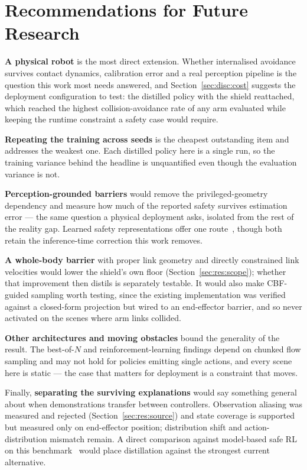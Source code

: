 \documentclass[a4paper,11pt]{report}
\begin{document}
\section{Recommendations for Future Research}\label{sec:conc:future}

\textbf{A physical robot} is the most direct extension. Whether internalised avoidance survives
contact dynamics, calibration error and a real perception pipeline is the question this work most
needs answered, and Section~\ref{sec:disc:cost} suggests the deployment configuration to test: the
distilled policy with the shield reattached, which reached the highest collision-avoidance rate of
any arm evaluated while keeping the runtime constraint a safety case would require.

\textbf{Repeating the training across seeds} is the cheapest outstanding item and addresses the
weakest one. Each distilled policy here is a single run, so the training variance behind the
headline is unquantified even though the evaluation variance is not.

\textbf{Perception-grounded barriers} would remove the privileged-geometry dependency and measure
how much of the reported safety survives estimation error --- the same question a physical
deployment asks, isolated from the rest of the reality gap. Learned safety representations offer
one route~\cite{meng2024conbat,sun2025lpb}, though both retain the inference-time correction this
work removes.

\textbf{A whole-body barrier} with proper link geometry and directly constrained link velocities
would lower the shield's own floor (Section~\ref{sec:res:scope}); whether that improvement then
distils is separately testable. It would also make CBF-guided sampling worth testing, since the
existing implementation was verified against a closed-form projection but wired to an
end-effector barrier, and so never activated on the scenes where arm links collided.

\textbf{Other architectures and moving obstacles} bound the generality of the result. The
best-of-$N$ and reinforcement-learning findings depend on chunked flow sampling and may not hold for
policies emitting single actions, and every scene here is static --- the case that matters for
deployment is a constraint that moves.

Finally, \textbf{separating the surviving explanations} would say something general about when
demonstrations transfer between controllers. Observation aliasing was measured and rejected
(Section~\ref{sec:res:source}) and state coverage is supported but measured only on
end-effector position; distribution shift and action-distribution mismatch remain. A direct
comparison against model-based safe RL on this benchmark~\cite{safedojo} would place distillation
against the strongest current alternative.
\end{document}
